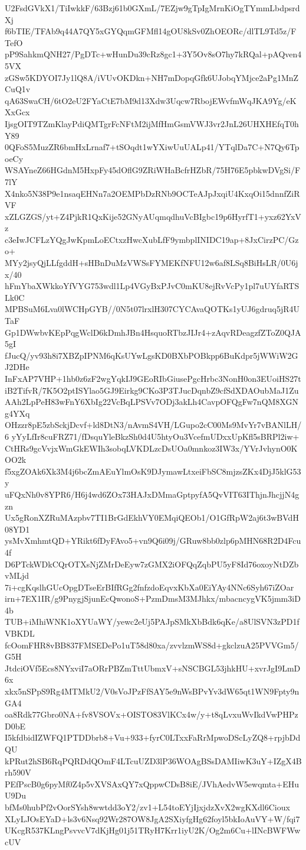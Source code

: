 U2FsdGVkX1/TiIwkkF/63Bzj61b0GXmL/7EZjw9gTpIgMrnKiOgTYmmLbdpsrdXj
f6bTIE/TFAb9q44A7QY5xGYQqmGFMfl14gOU8kSv0ZhOEORc/dlTL9Td5z/FTefO
pP9SahkmQNH27/PgDTc+wHunDu39cRz8gc1+3Y5Ov8sO7hy7kRQal+pAQven45VX
zGSw5KDYOI7Jy1lQ8A/iVUvOKDkn+NH7mDopqGfk6UJobqYMjce2aPg1MnZCuQ1v
qA63SwaCH/6tO2eU2FYaCtE7bM9d13Xdw3Uqcw7RbojEWvfmWqJKA9Yg/eKXxGcx
IjsgOIT9TZmKlayPdiQMTgrFcNFtM2ijMfHmGsmVWJ3vr2JnL26UHXHEfqT0hY89
0QFoS5MuzZR6bmHxLrnaf7+tSOqdt1wYXiwUuUALp41/YTqlDa7C+N7Qy6TpoeCy
WSAYneZ66HGdnM5HxpFy45dOflG9ZRiWHaBcfrHZbR/75H76E5pbkwDVgSi/F7lY
X4nko5N38P9e1nsaqEHNn7a2OEMPbDzRNb9OCTeAJpJxqiU4KxqOi15dnnfZiRVF
xZLGZGS/yt+Z4PjkR1QxKije52GNyAUqmqdhuVcBIgbc19p6HyrfT1+yxz62YxVz
c3eIwJCFLzYQgJwKpmLoECtxzHwcXubLfF9ymbplINIDC19ap+8JxCirzPC/Gzo+
MYy2jsyQjLLfgddH+sHBnDuMzVWSsFYMEKfNFU12w6af8LSq8BiHsLR/0U6jx/40
hFmYbaXWkkoYfVYG753wdl1Lp4VGyBxPJvC0mKU8ejRvVcPy1pl7uUYfaRTSLk0C
MPBSuM6Lva0lWCHpGYB//0N5t07lrxlH307CYCAvaQOTKs1yUJ6gdruq5jR4UTaF
Gp1DWwbvKEpPqgWclD6kDmhJBn4HsquoRTbzJIJr4+zAqvRDeagzfZToZ0QJA5gI
fJucQ/yv93h8i7XBZpIPNM6qKsUYwLgsKD0BXbPOBkpp6BuKdpr5jWWiW2GJ2DHe
InFxAP7VHP+1hb0z6zF2wgYqkIJ9GEoRIbGiusePgcHrbc3NonH0on3EUoiHS27t
iB2TifvR/7K5O2ptISYlao5GJ9Eirkg9CKo3P3TJucDqnbZ9cfSdXDAOubMaJ1Zu
AAh2LpPeH83wFnY6XbIg22VcBqLPSVv7ODj3akLh4CavpOFQgFw7nQM8XGNg4YXq
OHzzr8pE5zbSckjDcvf+ld8DtN3/nAvmS4VH/LGupo2cC00Ms9MvYr7vBANlLH/6
yYyLfIr8cuFRZ71/fDsquYleBkzSh0d4U5htyOu3VcefmUDxxUpKfl5sBRPl2iw+
CtHRs9gcVvjxWmGkEWIh3sobqLVKDLzcDsUOa0mnkoz3IW3x/YVrJvhynO0KOO2k
f5xgZOAk6Xk3M4j6bcZmAEuYlmOsK9DJymawLtxeiFbSC8mjzsZKx4DjJ5klG53y
uFQxNh0v8YPR6/H6j4wd6ZOx73HAJxDMmaGptpyfA5QvVIT63IThjnJhcjjN4gzn
Ux5gRonXZRuMAzpbv7TI1BrGdEkhVY0EMqiQEOb1/O1GfRpW2aj6t3wBVdH08YD1
ysMvXmhmtQD+YRikt6fDyFAvo5+vn9Q6i09j/GRuw8bb0zlp6pMHN68R2D4Fcu4f
D6PTckWDkCQrOTXsNjZMrDeEyw7zGMX2iOFQqZqbPU5yF8Id76oxoyNtDZbvMLjd
7i+cgKqslhGUcOpgDTseErBIfRGg2fnfzdoEqvxKbXa0EiYAy4NNc6Syh67iZOar
irn+7EX1IR/g9PnygjSjunEcQwonoS+PzmDmsM3MJhkx/mbacncygVK5jmm3iD4b
TUB+iMhiWNK1oXYUaWY/yewc2eUj5PAJpSMkXbBdk6qKe/a8UlSVN3zPD1fVBKDL
fcOomFHR8vBB837FMSEDePo1uT58d80xa/zvvlzmWS8d+gkclzuA25PVVGm5/G5H
JtdciOVf5Ecs8NYxviI7aORrPBZmTttUbmxV+sNSCBGL53jhkHU+xvrJgI9LmD6x
xkx5nSPpS9Rg4MTMkU2/V0sVoJPzFfSAY5e9nWsBPvYv3dW65qt1WN9Fpty9nGA4
oa8Rdk77Gbro0NA+fv8VSOVx+OISTO83VlKCx4w/y+t8qLvxuWvIkdVwPHPzD0bE
I5kfdbidIZWFQ1PTDDbrb8+Vu+933+fyrC0LTxxFaRrMpwoDScLyZQ8+rpjbDdQU
kPRut2hSB6RqPQRDdQOmF4LTcuUZD3lP36WOAgBSsDAMIiwK3uY+IZgX4Brh590V
PEfPscB0g6pyMf0Z4p5vXVSAxQY7xQppwCDsB8iE/JVhAedvW5ewqmta+EHuU9Du
bfMs0hubPf2vOorSYsh8wwtdd3oY2/zv1+L54toEYjIjxjdzXvX2wgKXdl6Cioux
XLyLJOsEYaD+ls3v6Nsq92Wr287OW8JgA2SXiyfgHg62foyl5bkIoAuVY+W/fqi7
UKcgR537KLngPsvvcV7dKjHg01j51TRyH7Krr1iyU2K/Og2m6Cu+lINcBWFWwcUV
